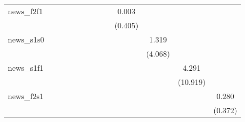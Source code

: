 {\begin{tabular}{l*{12}{c}}
\addlinespace
news\_f2f1   &                     &                     &                     &                     &                     &                     &                     &                     &       0.003         &                     &                     &                     \\
            &                     &                     &                     &                     &                     &                     &                     &                     &     (0.405)         &                     &                     &                     \\
\addlinespace
news\_s1s0   &                     &                     &                     &                     &                     &                     &                     &                     &                     &       1.319         &                     &                     \\
            &                     &                     &                     &                     &                     &                     &                     &                     &                     &     (4.068)         &                     &                     \\
\addlinespace
news\_s1f1   &                     &                     &                     &                     &                     &                     &                     &                     &                     &                     &       4.291         &                     \\
            &                     &                     &                     &                     &                     &                     &                     &                     &                     &                     &    (10.919)         &                     \\
\addlinespace
news\_f2s1   &                     &                     &                     &                     &                     &                     &                     &                     &                     &                     &                     &       0.280         \\
            &                     &                     &                     &                     &                     &                     &                     &                     &                     &                     &                     &     (0.372)         \\

\end{tabular}}
